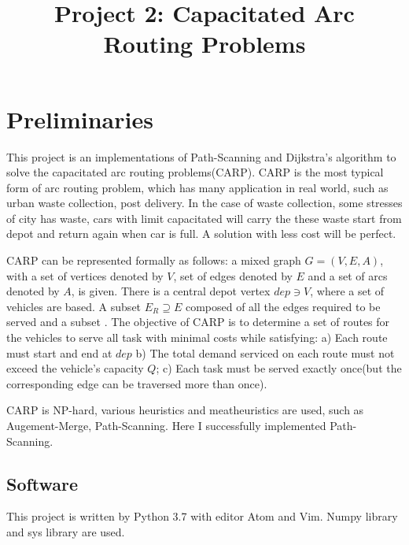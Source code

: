 \documentclass[conference,compsoc]{IEEEtran}
\begin{document}
\title{Project 2: Capacitated Arc Routing Problems }

\author{
}

\maketitle

\IEEEpeerreviewmaketitle

\section{Preliminaries}
This project is an implementations of Path-Scanning and Dijkstra's algorithm to
solve the capacitated arc routing problems(CARP). CARP is the most typical form
of arc routing problem, which has many application in real world, such as urban
waste collection, post delivery. \cite{1} In the case of waste collection, some
stresses of city has waste, cars with limit capacitated will carry the these
waste start from depot and return again when car is full. A solution with less
cost will be perfect.

CARP can be represented formally as follows: a mixed graph $G=(V,E,A)$, with a
set of  vertices denoted by $V$, set of edges denoted by $E$ and a set of arcs
denoted by $A$, is given. There is a central depot vertex $dep \ni V$, where a
set of vehicles are based. A subset $E_R \supseteq E$ composed of all the edges
required to be served and a subset . The objective of CARP is to determine a
set of routes for the vehicles to serve all task with minimal costs while
satisfying\cite{1}: 
a) Each route must start and end at $dep$
b) The total demand serviced on each route must not exceed the vehicle's
capacity $Q$; 
c) Each task must be served exactly once(but the corresponding edge can be traversed more
than once).

CARP is NP-hard, various heuristics and meatheuristics are used, such as
Augement-Merge, Path-Scanning. Here I successfully implemented Path-Scanning.


\subsection{Software}
This project is written by Python 3.7 with editor Atom and Vim. Numpy library
and sys library are used.
\end{document}
